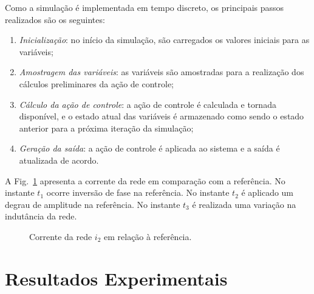 	Como a simulação é implementada em tempo discreto, os principais passos realizados são os seguintes:

	\begin{enumerate}
		\item \textit{Inicialização}: no início da simulação, são carregados os valores iniciais para as variáveis;
		\item \textit{Amostragem das variáveis}: as variáveis são amostradas para a realização dos cálculos preliminares da ação de controle;
		\item \textit{Cálculo da ação de controle}: a ação de controle é calculada e tornada disponível, e o estado atual das variáveis é armazenado como sendo o estado anterior para a próxima iteração da simulação;
		\item \textit{Geração da saída}: a ação de controle é aplicada ao sistema e a saída é atualizada de acordo.
	\end{enumerate}

	A Fig.~\ref{fig:i2_simulacao} apresenta a corrente da rede em comparação com a referência. No instante $t_1$ ocorre inversão de fase na referência. No instante $t_2$ é aplicado um degrau de amplitude na referência. No instante $t_3$ é realizada uma variação na indutância da rede.

	\begin{figure}[htb]
        \centering{
            \def\svgwidth{0.6\textwidth}
            }
        \renewcommand\figurename{Fig.}
        \caption{Corrente da rede $i_2$ em relação à referência.}
        \label{fig:i2_simulacao}
    \end{figure}

\section{Resultados Experimentais}



